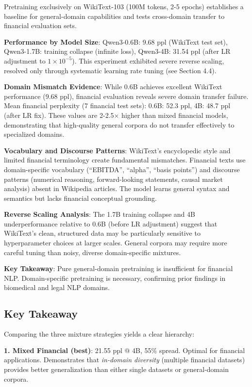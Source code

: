 Pretraining exclusively on WikiText-103 (100M tokens, 2-5 epochs) establishes a baseline for general-domain capabilities and tests cross-domain transfer to financial evaluation sets.

\textbf{Performance by Model Size}: Qwen3-0.6B: 9.68 ppl (WikiText test set), Qwen3-1.7B: training collapse (infinite loss), Qwen3-4B: 31.54 ppl (after LR adjustment to $1 \times 10^{-5}$). This experiment exhibited severe reverse scaling, resolved only through systematic learning rate tuning (see Section 4.4).

\textbf{Domain Mismatch Evidence}: While 0.6B achieves excellent WikiText performance (9.68 ppl), financial evaluation reveals severe domain transfer failure. Mean financial perplexity (7 financial test sets): 0.6B: 52.3 ppl, 4B: 48.7 ppl (after LR fix). These values are 2-2.5$\times$ higher than mixed financial models, demonstrating that high-quality general corpora do not transfer effectively to specialized domains.

\textbf{Vocabulary and Discourse Patterns}: WikiText's encyclopedic style and limited financial terminology create fundamental mismatches. Financial texts use domain-specific vocabulary (``EBITDA'', ``alpha'', ``basis points'') and discourse patterns (numerical reasoning, forward-looking statements, causal market analysis) absent in Wikipedia articles. The model learns general syntax and semantics but lacks financial conceptual grounding.

\textbf{Reverse Scaling Analysis}: The 1.7B training collapse and 4B underperformance relative to 0.6B (before LR adjustment) suggest that WikiText's clean, structured data may be particularly sensitive to hyperparameter choices at larger scales. General corpora may require more careful tuning than noisy, diverse domain-specific mixtures.

\textbf{Key Takeaway}: Pure general-domain pretraining is insufficient for financial NLP. Domain-specific pretraining is necessary, confirming prior findings in biomedical and legal NLP domains.

\subsection{Key Takeaway}

Comparing the three mixture strategies yields a clear hierarchy:

\textbf{1. Mixed Financial (best)}: 21.55 ppl @ 4B, 55\% spread. Optimal for financial applications. Demonstrates that \textit{in-domain diversity} (multiple financial datasets) provides better generalization than either single datasets or general-domain corpora.

